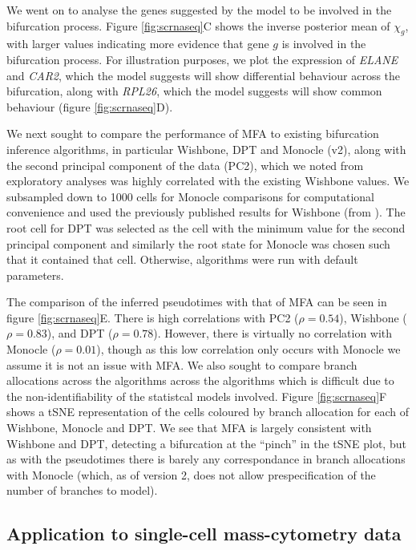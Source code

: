 We went on to analyse the genes suggested by the model to be involved in the bifurcation process. Figure \ref{fig:scrnaseq}C shows the inverse posterior mean of $\chi_g$, with larger values indicating more evidence that gene $g$ is involved in the bifurcation process. For illustration purposes, we plot the expression of \emph{ELANE} and \emph{CAR2}, which the model suggests will show differential behaviour across the bifurcation, along with \emph{RPL26}, which the model suggests will show common behaviour (figure \ref{fig:scrnaseq}D).

We next sought to compare the performance of MFA to existing bifurcation inference algorithms, in particular Wishbone, DPT and Monocle (v2), along with the second principal component of the data (PC2), which we noted from exploratory analyses was highly correlated with the existing Wishbone values.
We subsampled down to 1000 cells for Monocle comparisons for computational convenience and used the previously published results for Wishbone  (from \cite{setty2016wishbone}).
The root cell for DPT was selected as the cell with the minimum value for the second principal component and similarly the root state for Monocle was chosen such that it contained that cell. Otherwise, algorithms were run with default parameters.

The comparison of the inferred pseudotimes with that of MFA can be seen in figure \ref{fig:scrnaseq}E. There is high correlations with PC2 ($\rho = 0.54$), Wishbone ($\rho = 0.83$), and DPT ($\rho = 0.78$). However, there is virtually no correlation with Monocle ($\rho = 0.01$), though as this low correlation only occurs with Monocle we assume it is not an issue with MFA. We also sought to compare branch allocations across the algorithms across the algorithms which is difficult due to the non-identifiability of the statistcal models involved. Figure \ref{fig:scrnaseq}F shows a tSNE representation of the cells coloured by branch allocation for each of Wishbone, Monocle and DPT. We see that MFA is largely consistent with Wishbone and DPT, detecting a bifurcation at the ``pinch'' in the tSNE plot, but as with the pseudotimes there is barely any correspondance in branch allocations with Monocle (which, as of version 2, does not allow prespecification of the number of branches to model).

\subsection{Application to single-cell mass-cytometry data}

